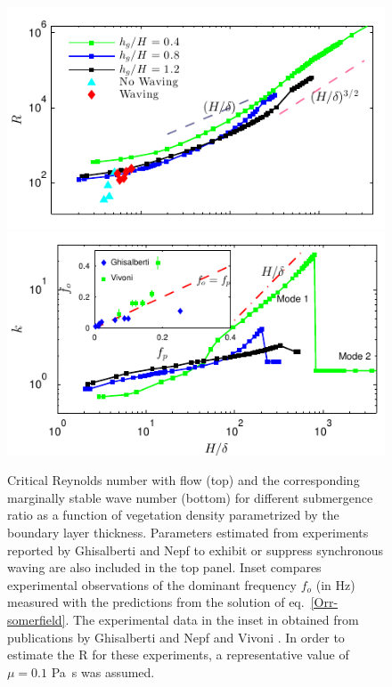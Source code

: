 \documentclass[aps,prl,twocolumn,superscriptaddress,10pt]{revtex4-1}  %
\newcommand{\Rey}{\text{R}}
\begin{document}
\begin{figure}
\begin{center}
\includegraphics[]{Critical_Re_vs_delta_noshear} \\
\vspace{-6mm} \hspace{-3mm}
\includegraphics[]{K_vs_shear_width_noshear}
\end{center}
\caption{Critical Reynolds number with flow (top) and the corresponding marginally stable wave number (bottom) for different submergence ratio as a function of vegetation density
 parametrized by the boundary layer thickness. Parameters estimated from experiments reported by Ghisalberti and Nepf \cite{Ghisal02} to exhibit or suppress synchronous waving are 
also included in the top panel. Inset compares experimental observations 
of the dominant frequency $f_o$ (in Hz) measured with the predictions from the solution of eq.~\eqref{Orr-somerfield}. The experimental data in the inset in obtained from publications by 
Ghisalberti and Nepf \cite{Ghisal02} and Vivoni \cite{Vivoni98}. In order to estimate the $\Rey$ for these experiments, a representative value of $\mu=0.1$ Pa~s was assumed.}
\label{Re_vs_delta}
\end{figure}
\end{document}
